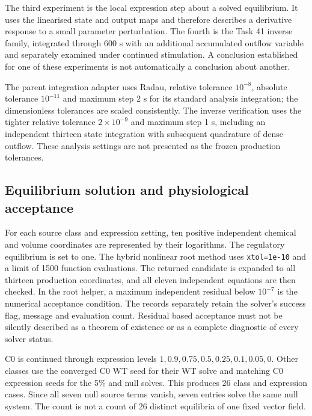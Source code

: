 The third experiment is the local expression step about a solved equilibrium. It uses the linearised state and output maps and therefore describes a derivative response to a small parameter perturbation. The fourth is the Task 41 inverse family, integrated through 600 s with an additional accumulated outflow variable and separately examined under continued stimulation. A conclusion established for one of these experiments is not automatically a conclusion about another.

The parent integration adapter uses Radau, relative tolerance $10^{-8}$, absolute tolerance $10^{-11}$ and maximum step 2 s for its standard analysis integration; the dimensionless tolerances are scaled consistently. The inverse verification uses the tighter relative tolerance $2\times10^{-9}$ and maximum step 1 s, including an independent thirteen state integration with subsequent quadrature of dense outflow. These analysis settings are not presented as the frozen production tolerances.

\subsection{Equilibrium solution and physiological acceptance}
For each source class and expression setting, ten positive independent chemical and volume coordinates are represented by their logarithms. The regulatory equilibrium is set to one. The hybrid nonlinear root method uses \texttt{xtol=1e-10} and a limit of 1500 function evaluations. The returned candidate is expanded to all thirteen production coordinates, and all eleven independent equations are then checked. In the root helper, a maximum independent residual below $10^{-7}$ is the numerical acceptance condition. The records separately retain the solver's success flag, message and evaluation count. Residual based acceptance must not be silently described as a theorem of existence or as a complete diagnostic of every solver status.

C0 is continued through expression levels $1,0.9,0.75,0.5,0.25,0.1,0.05,0$. Other classes use the converged C0 WT seed for their WT solve and matching C0 expression seeds for the 5\% and null solves. This produces 26 class and expression cases. Since all seven null source terms vanish, seven entries solve the same null system. The count is not a count of 26 distinct equilibria of one fixed vector field.

